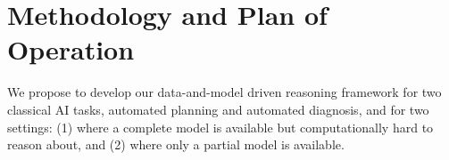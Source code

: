 \documentclass[12pt]{article}
\newcommand{\note}[1]{\textbf{\textit{#1}}}
\begin{document}

  







\section{Methodology and Plan of Operation}
\label{sec:methodology}


We propose to develop our data-and-model driven reasoning framework for two classical AI tasks, automated planning and automated diagnosis, and for two settings: (1) where a complete model is available but computationally hard to reason about, and (2) where only a partial model is available. 


\end{document}
